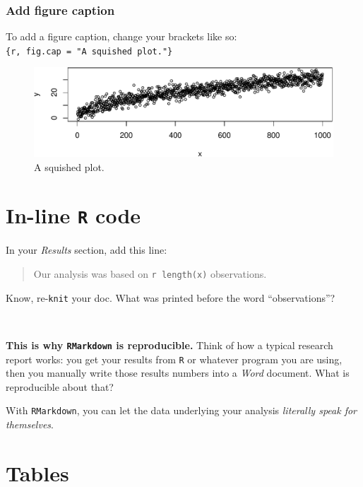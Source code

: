 \documentclass[]{book}
\begin{document}
\hypertarget{add-figure-caption}{%
\subsubsection*{Add figure caption}\label{add-figure-caption}}

To add a figure caption, change your brackets like so: \texttt{\{r,\ fig.cap\ =\ "A\ squished\ plot."\}}

\begin{figure}
\centering
\includegraphics{figures/unnamed-chunk-361-1.pdf}
\caption{\label{fig:unnamed-chunk-361}A squished plot.}
\end{figure}

\hypertarget{in-line-r-code}{%
\section*{\texorpdfstring{In-line \texttt{R} code}{In-line R code}}\label{in-line-r-code}}

In your \emph{Results} section, add this line:

\begin{quote}
Our analysis was based on \texttt{\textasciigrave{}r\ length(x)\textasciigrave{}} observations.
\end{quote}

Know, re-\texttt{knit} your doc. What was printed before the word ``observations''?

~

\textbf{This is why \texttt{RMarkdown} is reproducible.} Think of how a typical research report works: you get your results from
\texttt{R} or whatever program you are using, then you manually write those results numbers into a \emph{Word} document. What is reproducible about that?

With \texttt{RMarkdown}, you can let the data underlying your analysis \emph{literally speak for themselves}.

\hypertarget{tables}{%
\section*{Tables}\label{tables}}
\end{document}
